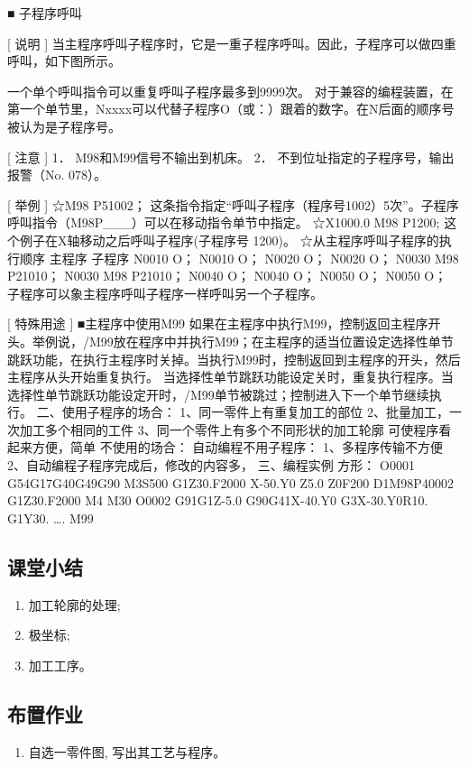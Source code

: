 ■	子程序呼叫

[ 说明 ]
当主程序呼叫子程序时，它是一重子程序呼叫。因此，子程序可以做四重呼叫，如下图所示。                                                 

一个单个呼叫指令可以重复呼叫子程序最多到9999次。
对于兼容的编程装置，在第一个单节里，Nxxxx可以代替子程序O（或：）跟着的数字。在N后面的顺序号被认为是子程序号。

[ 注意 ]
1．	M98和M99信号不输出到机床。
2．	不到位址指定的子程序号，输出报警（No. 078）。

[ 举例 ]
☆M98 P51002；
这条指令指定“呼叫子程序（程序号1002）5次”。子程序呼叫指令（M98P\_\_\_）可以在移动指令单节中指定。
☆X1000.0 M98 P1200;
这个例子在X轴移动之后呼叫子程序(子程序号 1200)。
☆从主程序呼叫子程序的执行顺序
主程序                   子程序
N0010 O；               N0010 O；         
N0020 O；               N0020 O；         
N0030 M98 P21010；      N0030 M98 P21010；                 
N0040 O；               N0040 O；             
N0050 O；               N0050 O；
子程序可以象主程序呼叫子程序一样呼叫另一个子程序。

[ 特殊用途 ] 
■主程序中使用M99
如果在主程序中执行M99，控制返回主程序开头。举例说，/M99放在程序中并执行M99；在主程序的适当位置设定选择性单节跳跃功能，在执行主程序时关掉。当执行M99时，控制返回到主程序的开头，然后主程序从头开始重复执行。
当选择性单节跳跃功能设定关时，重复执行程序。当选择性单节跳跃功能设定开时，/M99单节被跳过；控制进入下一个单节继续执行。
二、使用子程序的场合：
1、同一零件上有重复加工的部位
2、批量加工，一次加工多个相同的工件
3、同一个零件上有多个不同形状的加工轮廓
可使程序看起来方便，简单
不使用的场合：
自动编程不用子程序：
1、多程序传输不方便
2、自动编程子程序完成后，修改的内容多，
三、编程实例
方形：
O0001
G54G17G40G49G90
M3S500
G1Z30.F2000
X-50.Y0
Z5.0
Z0F200
D1M98P40002
G1Z30.F2000
M4
M30
O0002
G91G1Z-5.0
G90G41X-40.Y0
G3X-30.Y0R10.
G1Y30.
….
M99

\subsection{课堂小结}
\begin{enumerate}[1、]
	\item 加工轮廓的处理;
	\item 极坐标;
	\item 加工工序。
\end{enumerate}

\vfill
\subsection{布置作业}
\begin{enumerate}[1、]
	\item 自选一零件图, 写出其工艺与程序。 
\end{enumerate}
\vfill